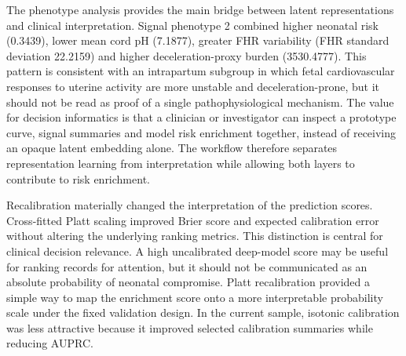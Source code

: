 \documentclass[pdflatex,sn-nature]{sn-jnl}
\begin{document}
The phenotype analysis provides the main bridge between latent representations and clinical interpretation. Signal phenotype 2 combined higher neonatal risk (0.3439), lower mean cord pH (7.1877), greater FHR variability (FHR standard deviation 22.2159) and higher deceleration-proxy burden (3530.4777). This pattern is consistent with an intrapartum subgroup in which fetal cardiovascular responses to uterine activity are more unstable and deceleration-prone, but it should not be read as proof of a single pathophysiological mechanism. The value for decision informatics is that a clinician or investigator can inspect a prototype curve, signal summaries and model risk enrichment together, instead of receiving an opaque latent embedding alone. The workflow therefore separates representation learning from interpretation while allowing both layers to contribute to risk enrichment.

Recalibration materially changed the interpretation of the prediction scores. Cross-fitted Platt scaling improved Brier score and expected calibration error without altering the underlying ranking metrics. This distinction is central for clinical decision relevance. A high uncalibrated deep-model score may be useful for ranking records for attention, but it should not be communicated as an absolute probability of neonatal compromise. Platt recalibration provided a simple way to map the enrichment score onto a more interpretable probability scale under the fixed validation design. In the current sample, isotonic calibration was less attractive because it improved selected calibration summaries while reducing AUPRC.
\end{document}
